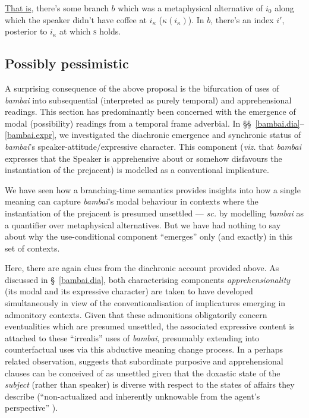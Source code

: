 \ul{That is}, there's some branch $ b $ which was a metaphysical alternative of $ i_0 $ along which the speaker didn't have coffee at $ i_\kappa $ ($ \kappa(i_\kappa) $). In $ b $, there's an index $ i' $, posterior to $ i_\kappa $ at which \textsc{s} holds.
\xe


\subsection{Possibly pessimistic}

A surprising consequence of the above proposal is the bifurcation of uses of \textit{bambai} into subsequential (interpreted as purely temporal) and apprehensional readings. This section has predominantly been concerned with the emergence of modal (possibility) readings from a temporal frame adverbial. In \S\S~\ref{bambai.dia}--\ref{bambai.expr}, we investigated the diachronic emergence and synchronic status of \textit{bambai}'s speaker-attitude/expressive character. This component (\textit{viz.} that \textit{bambai} expresses that the Speaker is apprehensive about or somehow disfavours the instantiation of the prejacent) is modelled as a conventional implicature.

We have seen how a branching-time semantics provides insights into how a single meaning can capture \textit{bambai}'s modal behaviour in contexts where the instantiation of the prejacent is presumed unsettled --- \textit{sc.} by modelling \textit{bambai} as a quantifier over metaphysical alternatives. But we have had nothing to say about why the use-conditional component ``emerges'' only (and exactly) in this set of contexts.

Here, there are again clues from the diachronic account provided above. As discussed in \S~\ref{bambai.dia}, both characterising components \textit{apprehensionality} (its modal and its expressive character) are taken to have developed simultaneously in view of the conventionalisation of implicatures emerging in admonitory contexts. Given that these admonitions obligatorily concern eventualities which are presumed unsettled, the associated expressive content is attached to these ``irrealis'' uses of \textit{bambai}, presumably extending into counterfactual uses via this abductive meaning change process. In a perhaps related observation, \citeauthor{Verstraete2006} suggests that subordinate purposive and apprehensional clauses can be conceived of as unsettled given that the doxastic state of the \textit{subject} (rather than speaker) is diverse with respect to the states of affairs they describe (``non-actualized and inherently unknowable from the agent's perspective'' \citeyear[71]{Verstraete2006}).


